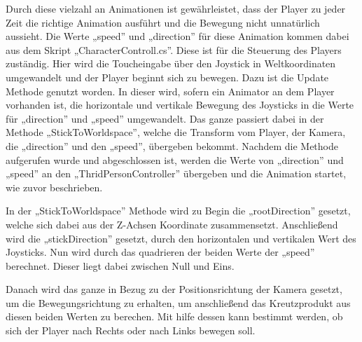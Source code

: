 	Durch diese vielzahl an Animationen ist gewährleistet, dass der Player zu jeder Zeit die richtige Animation ausführt und die Bewegung nicht unnatürlich aussieht. Die Werte „speed” und „direction” für diese Animation kommen dabei aus dem Skript „CharacterControll.cs”. Diese ist für die Steuerung des Players zuständig. Hier wird die Toucheingabe über den Joystick in Weltkoordinaten umgewandelt und der Player beginnt sich zu bewegen. Dazu ist die Update Methode genutzt worden. In dieser wird, sofern ein Animator an dem Player vorhanden ist, die horizontale und vertikale Bewegung des Joysticks in die Werte für „direction” und „speed” umgewandelt. Das ganze passiert dabei in der Methode „StickToWorldspace”, welche die Transform vom Player, der Kamera, die „direction” und den „speed”, übergeben bekommt. Nachdem die Methode aufgerufen wurde und abgeschlossen ist, werden die Werte von „direction” und „speed” an den „ThridPersonController” übergeben und die Animation startet, wie zuvor beschrieben.

	In der „StickToWorldspace” Methode wird zu Begin die „rootDirection” gesetzt, welche sich dabei aus der Z-Achsen Koordinate zusammensetzt. Anschließend wird die „stickDirection” gesetzt, durch den horizontalen und vertikalen Wert des Joysticks. Nun wird durch das quadrieren der beiden Werte der „speed” berechnet. Dieser liegt dabei zwischen Null und Eins.

	Danach wird das ganze in Bezug zu der Positionsrichtung der Kamera gesetzt, um die Bewegungsrichtung zu erhalten, um anschließend das Kreutzprodukt aus diesen beiden Werten zu berechen. Mit hilfe dessen kann bestimmt werden, ob sich der Player nach Rechts oder nach Links bewegen soll.

